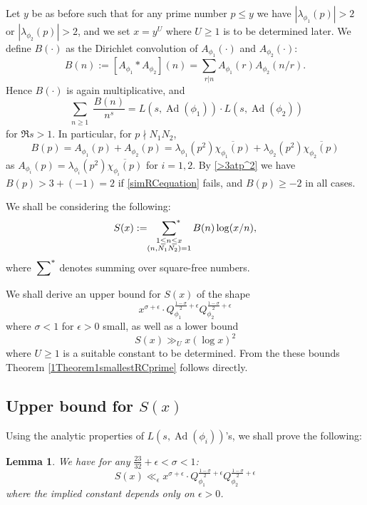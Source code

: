 \documentclass[10pt,leqno]{amsart}
\theoremstyle{plain}
\newtheorem{lemma}{Lemma}
\theoremstyle{definition}
\theoremstyle{remark}
\numberwithin{equation}{section}
\newcommand{\psum}{\sideset{}{^*}\sum}
\newcommand{\Ad}{\operatorname{Ad}}
\begin{document}
Let $y$ be as before such that for any prime number $p \leq y$ we have $|\lambda_{\phi_1}(p)| > 2$ or $|\lambda_{\phi_2}(p)| > 2$, and we set $x = y^U$ where $U \geq 1$ is to be determined later. We define $B(\cdot)$ as the Dirichlet convolution of $A_{\phi_1}(\cdot)$ and $A_{\phi_2}(\cdot)$:  
\[
    B(n) := [A_{\phi_1} * A_{\phi_2}](n) 
    = \sum_{r|n}A_{\phi_1}(r)A_{\phi_2}(n/r).
\]
Hence $B(\cdot)$ is again multiplicative, and 
\[
    \sum_{\substack{n\geq 1}}\frac{B(n)}{n^s} = L(s, \Ad(\phi_1))\cdot L(s, \Ad(\phi_2))
\]
for $\Re s > 1$.
In particular, for $p\nmid N_1N_2$, 
\begin{equation*}\label{B()atprime}
    B(p) = A_{\phi_1}(p) + A_{\phi_2}(p) = \lambda_{\phi_1}(p^2)\overline{\chi_{\phi_1}(p)} + \lambda_{\phi_2}(p^2)\overline{\chi_{\phi_2}(p)}
\end{equation*}
as $A_{\phi_{i}}(p) = \lambda_{\phi_i}(p^2)\overline{\chi_{\phi_i}(p)}$ for $i = 1,2$.
By \eqref{>3atp^2} we have $B(p) > 3 + (-1) = 2$ if \eqref{simRCequation} fails, and $B(p) \geq -2$ in all cases.

We shall be considering the following:
\[
    S(x) := \psum_{\substack{1 \leq n \leq x \\ (n,N_1N_2)=1}}B(n)\log(x/n),
\]
where $\psum$ denotes summing over square-free numbers.

We shall derive an upper bound for $S(x)$ of the shape
\[
    x^{\sigma+\epsilon}\cdot Q_{\phi_1}^{\frac{1-\sigma}{2}+\epsilon}Q_{\phi_2}^{\frac{1-\sigma}{2}
    +\epsilon}
\]
where $\sigma < 1$ for $\epsilon >0$ small,
as well as a lower bound 
\[
    S(x) \gg_U x(\log x)^2
\]
where $U \geq 1$ is a suitable constant to be determined.
From the these bounds Theorem \ref{1Theorem1smallestRCprime} follows directly.

\subsection{Upper bound for $S(x)$}
Using the analytic properties of $L(s, \Ad(\phi_i))$'s, we shall prove the following:
\begin{lemma}\label{UpperBoundforS(x)}
    We have for any $\frac{23}{32} + \epsilon< \sigma < 1$: 
    \[
        S(x) \ll_{\epsilon} x^{\sigma+\epsilon}\cdot Q_{\phi_1}^{\frac{1-\sigma}{2}+\epsilon}Q_{\phi_2}^{\frac{1-\sigma}{2}+\epsilon}
    \]
    where the implied constant depends only on $\epsilon > 0$.
\end{lemma}
\end{document}
